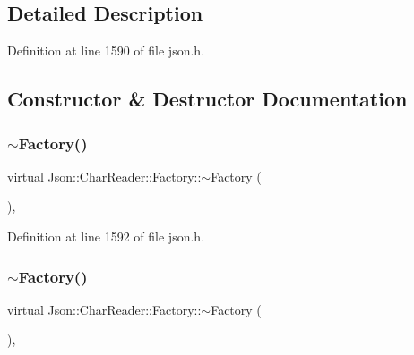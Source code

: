 \subsection{Detailed Description}


Definition at line 1590 of file json.\+h.



\subsection{Constructor \& Destructor Documentation}
\hypertarget{class_json_1_1_char_reader_1_1_factory_ae6938f632fa57f88e05818add5bc21be}{}\label{class_json_1_1_char_reader_1_1_factory_ae6938f632fa57f88e05818add5bc21be} 
\subsubsection{\texorpdfstring{$\sim$\+Factory()}{~Factory()}\hspace{0.1cm}{\footnotesize\ttfamily [1/2]}}
{\footnotesize\ttfamily virtual Json\+::\+Char\+Reader\+::\+Factory\+::$\sim$\+Factory (\begin{DoxyParamCaption}{ }\end{DoxyParamCaption})\hspace{0.3cm}{\ttfamily [inline]}, {\ttfamily [virtual]}}



Definition at line 1592 of file json.\+h.

\hypertarget{class_json_1_1_char_reader_1_1_factory_ae6938f632fa57f88e05818add5bc21be}{}\label{class_json_1_1_char_reader_1_1_factory_ae6938f632fa57f88e05818add5bc21be} 
\subsubsection{\texorpdfstring{$\sim$\+Factory()}{~Factory()}\hspace{0.1cm}{\footnotesize\ttfamily [2/2]}}
{\footnotesize\ttfamily virtual Json\+::\+Char\+Reader\+::\+Factory\+::$\sim$\+Factory (\begin{DoxyParamCaption}{ }\end{DoxyParamCaption})\hspace{0.3cm}{\ttfamily [inline]}, {\ttfamily [virtual]}}



